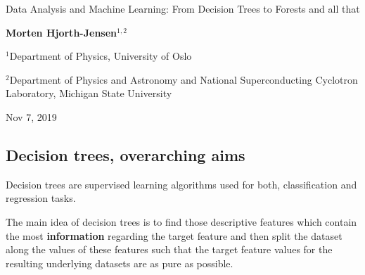 \documentclass[%
oneside,                 %
final,                   %
10pt]{article}
\begin{document}

\newcommand{\exercisesection}[1]{\subsection*{#1}}






\thispagestyle{empty}

\begin{center}
{\LARGE\bf
\begin{spacing}{1.25}
Data Analysis and Machine Learning: From Decision Trees to Forests and all that
\end{spacing}
}
\end{center}


\begin{center}
{\bf Morten Hjorth-Jensen${}^{1, 2}$} \\ [0mm]
\end{center}

\begin{center}
\centerline{{\small ${}^1$Department of Physics, University of Oslo}}
\centerline{{\small ${}^2$Department of Physics and Astronomy and National Superconducting Cyclotron Laboratory, Michigan State University}}
\end{center}
    

\begin{center}
Nov 7, 2019
\end{center}

\vspace{1cm}


\subsection*{Decision trees, overarching aims}


Decision trees are supervised learning algorithms used for both,
classification and regression tasks.


The main idea of decision trees
is to find those descriptive features which contain the most
\textbf{information} regarding the target feature and then split the dataset
along the values of these features such that the target feature values
for the resulting underlying datasets are as pure as possible.
\end{document}
